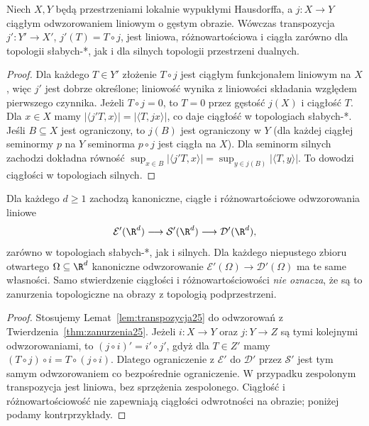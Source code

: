 \begin{lemat}
\label{lem:transpozycja25}
Niech $X,Y$ będą przestrzeniami lokalnie wypukłymi
Hausdorffa, a $j:X\to Y$ ciągłym odwzorowaniem liniowym
o gęstym obrazie. Wówczas transpozycja
$j':Y'\to X'$, $j'(T)=T\circ j$, jest liniowa,
różnowartościowa i ciągła zarówno dla topologii słabych-*, jak i dla
silnych topologii przestrzeni dualnych.
\end{lemat}
\begin{proof}
Dla każdego $T\in Y'$ złożenie $T\circ j$ jest ciągłym
funkcjonałem liniowym na $X$, więc $j'$ jest dobrze
określone; liniowość wynika z liniowości składania
względem pierwszego czynnika. Jeżeli $T\circ j=0$,
to $T=0$ przez gęstość $j(X)$ i ciągłość $T$.
Dla $x\in X$ mamy
$|\langle j'T,x\rangle|=|\langle T,jx\rangle|$,
co daje ciągłość w topologiach słabych-*.
Jeśli $B\subseteq X$ jest ograniczony, to $j(B)$ jest
ograniczony w $Y$ (dla każdej ciągłej seminormy $p$
na $Y$ seminorma $p\circ j$ jest ciągła na $X$).
Dla seminorm silnych zachodzi dokładna równość
$\sup_{x\in B}|\langle j'T,x\rangle|
= \sup_{y\in j(B)}|\langle T,y\rangle|$.
To dowodzi ciągłości w topologiach silnych.
\end{proof}

\begin{wniosek}
\label{cor:dual-lancuch25}
Dla każdego $d\ge1$ zachodzą kanoniczne, ciągłe i
różnowartościowe odwzorowania liniowe
\[
 \mathcal E'(\R^d)\longrightarrow\mathcal S'(\R^d)
 \longrightarrow\mathcal D'(\R^d),
\]
zarówno w topologiach słabych-*, jak i silnych.
Dla każdego niepustego zbioru otwartego $\Omega\subseteq\R^d$
kanoniczne odwzorowanie
$\mathcal E'(\Omega)\to\mathcal D'(\Omega)$
ma te same własności. Samo stwierdzenie ciągłości i
różnowartościowości \emph{nie oznacza}, że są to zanurzenia
topologiczne na obrazy z topologią podprzestrzeni.
\end{wniosek}
\begin{proof}
Stosujemy Lemat~\ref{lem:transpozycja25} do odwzorowań
z Twierdzenia~\ref{thm:zanurzenia25}. Jeżeli $i:X\to Y$
oraz $j:Y\to Z$ są tymi kolejnymi odwzorowaniami,
to $(j\circ i)'=i'\circ j'$, gdyż dla $T\in Z'$
mamy $(T\circ j)\circ i=T\circ(j\circ i)$.
Dlatego ograniczenie z $\mathcal E'$ do $\mathcal D'$
przez $\mathcal S'$ jest tym samym odwzorowaniem co
bezpośrednie ograniczenie. W przypadku zespolonym
transpozycja jest liniowa, bez sprzężenia zespolonego.
Ciągłość i różnowartościowość nie zapewniają ciągłości
odwrotności na obrazie; poniżej podamy kontrprzykłady.
\end{proof}
